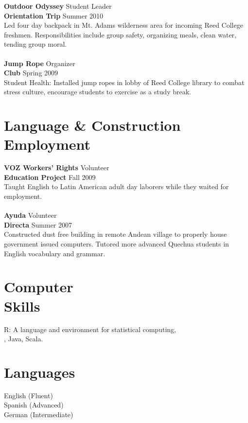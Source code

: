\documentclass[margin,line]{resume}
\begin{document}
\begin{resume}
\textbf{Outdoor Odyssey} \hfill Student Leader \\
\textbf{Orientation Trip} \hfill Summer 2010 \\
Led four day backpack in Mt. Adams wilderness area for incoming Reed College freshmen. Responsibilities include group safety, organizing meals, clean water, tending group moral.
\\\vspace{-2mm}\\
\textbf{Jump Rope} \hfill Organizer
\\\textbf{Club}  \hfill Spring 2009\\
Student Health: Installed jump ropes in lobby of Reed College library to combat stress culture, encourage students to exercise as a study break. 



	\section{\mysidestyle Language \& Construction \\ Employment}
\textbf{VOZ Workers' Rights}  \hfill Volunteer \\ \textbf{Education Project} \hfill Fall 2009 \\ Taught English to Latin American adult day laborers while they waited for employment. \\
\vspace{-2mm}\\    
\textbf{Ayuda} \hfill Volunteer \\    
\textbf{Directa} \hfill Summer 2007	\\
Constructed dust free building in remote Andean village to properly house government issued computers. Tutored more advanced Quechua students in English vocabulary and grammar.    


    \section{\mysidestyle Computer\\Skills}
 R: A language and environment for statistical computing, \\ \LaTeXe,  Java, Scala.
    \section{\mysidestyle Languages}
English (Fluent) \\
Spanish (Advanced)\\
German (Intermediate)   %


\end{resume}
\end{document}
